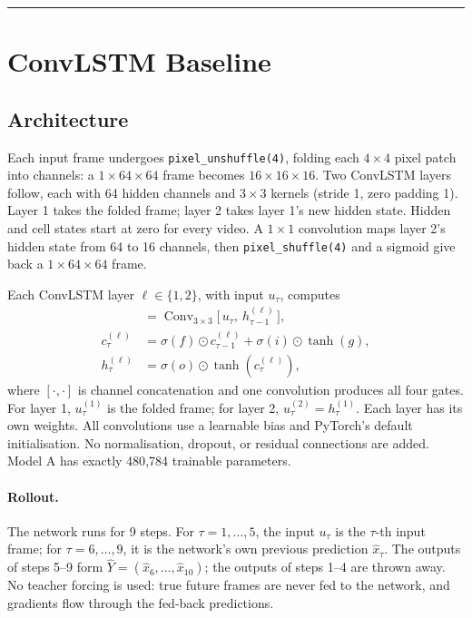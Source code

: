 \documentclass[11pt,letterpaper]{article}
\begin{document}
\vspace{10pt}
\hrule
\vspace{4pt}

\section*{ConvLSTM Baseline}

\subsection*{Architecture}

Each input frame undergoes
\texttt{pixel\_unshuffle(4)}, folding each $4\times4$ pixel patch into channels: a $1\times64\times64$ frame becomes
$16\times16\times16$. Two ConvLSTM layers follow, each with 64 hidden channels and $3\times3$ kernels (stride 1, zero
padding 1). Layer 1 takes the folded frame; layer 2 takes layer 1's new hidden state. Hidden and cell states start at
zero for every video. A $1\times1$ convolution maps layer 2's hidden state from 64 to 16 channels, then
\texttt{pixel\_shuffle(4)} and a sigmoid give back a $1\times64\times64$ frame.

Each ConvLSTM layer $\ell\in\{1,2\}$, with input $u_\tau$, computes
\begin{align*}
[\,i,\ f,\ o,\ g\,] &= \operatorname{Conv}_{3\times3}\big[\,u_\tau,\ h^{(\ell)}_{\tau-1}\,\big],\\
c^{(\ell)}_\tau &= \sigma(f)\odot c^{(\ell)}_{\tau-1} + \sigma(i)\odot\tanh(g),\\
h^{(\ell)}_\tau &= \sigma(o)\odot\tanh(c^{(\ell)}_\tau),
\end{align*}
where $[\cdot,\cdot]$ is channel concatenation and one convolution produces all four gates. For layer 1,
$u^{(1)}_\tau$ is the folded frame; for layer 2, $u^{(2)}_\tau = h^{(1)}_\tau$. Each layer has its own weights. All
convolutions use a learnable bias and PyTorch's default initialisation. No normalisation, dropout, or residual
connections are added. Model A has exactly 480{,}784 trainable parameters.

\paragraph{Rollout.} The network runs for 9 steps. For $\tau=1,\dots,5$, the input $u_\tau$ is the $\tau$-th input frame;
for $\tau=6,\dots,9$, it is the network's own previous prediction $\hat{x}_\tau$. The outputs of steps 5--9 form
$\hat{Y}=(\hat{x}_6,\dots,\hat{x}_{10})$; the outputs of steps 1--4 are thrown away. No teacher forcing is used: true
future frames are never fed to the network, and gradients flow through the fed-back predictions.
\end{document}
